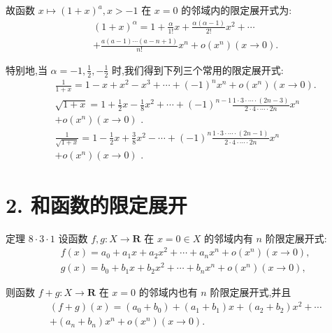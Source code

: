 故函数 $x \mapsto  {\left( 1 + x\right) }^{a},x >  - 1$ 在 $x = 0$ 的邻域内的限定展开式为:
\begin{align*}
	&{\left( 1 + x\right) }^{\alpha } = 1 + \frac{\alpha }{1!}x + \frac{\alpha \left( {\alpha  - 1}\right) }{2!}{x}^{2} + \cdots\\
	&+ \frac{a\left( {a - 1}\right) \cdots \left( {a - n + 1}\right) }{n!}{x}^{n} + o\left( {x}^{n}\right) \left( {x \rightarrow  0}\right) .
\end{align*}

特别地,当 $\alpha  =  - 1,\frac{1}{2}, - \frac{1}{2}$ 时,我们得到下列三个常用的限定展开式:
\begin{align*}
	&\frac{1}{1 + x} = 1 - x + {x}^{2} - {x}^{3} + \cdots  + {\left( -1\right) }^{n}{x}^{n} + o\left( {x}^{n}\right) \left( {x \rightarrow  0}\right) .\\
	&\sqrt{1 + x} = 1 + \frac{1}{2}x - \frac{1}{8}{x}^{2} + \cdots  + {\left( -1\right) }^{n - 1}\frac{1 \cdot  3 \cdot  \cdots  \cdot  \left( {{2n} - 3}\right) }{2 \cdot  4 \cdot  \cdots  \cdot  {2n}}{x}^{n}\\
	&+ o\left( {x}^{n}\right) \left( {x \rightarrow  0}\right) \text{ . }\\
	&\frac{1}{\sqrt{1 + x}} = 1 - \frac{1}{2}x + \frac{3}{8}{x}^{2} - \cdots  + {\left( -1\right) }^{n}\frac{1 \cdot  3 \cdot  \cdots  \cdot  \left( {{2n} - 1}\right) }{2 \cdot  4 \cdot  \cdots  \cdot  {2n}}{x}^{n}\\
	&+ o\left( {x}^{n}\right) \left( {x \rightarrow  0}\right) \text{ . }
\end{align*}

\section*{2. 和函数的限定展开}

定理 $8 \cdot  3 \cdot  1$ 设函数 $f,g : X \rightarrow  \mathbf{R}$ 在 $x = 0 \in  X$ 的邻域内有 $n$ 阶限定展开式:
\begin{align*}
	&f\left( x\right)  = {a}_{0} + {a}_{1}x + {a}_{2}{x}^{2} + \cdots  + {a}_{n}{x}^{n} + o\left( {x}^{n}\right) \left( {x \rightarrow  0}\right) ,\\
	&g\left( x\right)  = {b}_{0} + {b}_{1}x + {b}_{2}{x}^{2} + \cdots  + {b}_{n}{x}^{n} + o\left( {x}^{n}\right) \left( {x \rightarrow  0}\right) ,
\end{align*}

则函数 $f + g : X \rightarrow  \mathbf{R}$ 在 $x = 0$ 的邻域内也有 $n$ 阶限定展开式,并且
\begin{align*}
	&\left( {f + g}\right) \left( x\right)  = \left( {{a}_{0} + {b}_{0}}\right)  + \left( {{a}_{1} + {b}_{1}}\right) x + \left( {{a}_{2} + {b}_{2}}\right) {x}^{2} + \cdots\\
	&+ \left( {{a}_{n} + {b}_{n}}\right) {x}^{n} + o\left( {x}^{n}\right) \left( {x \rightarrow  0}\right) .
\end{align*}

